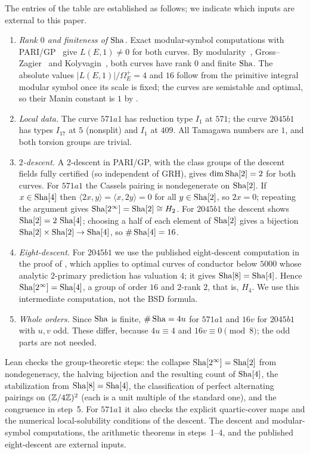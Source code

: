 The entries of the table are established as follows; we indicate which
inputs are external to this paper.
\begin{enumerate}
\item \emph{Rank $0$ and finiteness of $\operatorname{Sha}$.}  Exact modular-symbol
  computations with PARI/GP~\citep{PARI2023} give $L(E,1)\neq0$ for both
  curves.  By modularity~\citep{Wiles1995,BreuilConradDiamondTaylor2001},
  Gross--Zagier~\citep{GrossZagier1986} and
  Kolyvagin~\citep{Kolyvagin1990}, both curves have rank $0$ and finite
  $\operatorname{Sha}$.  The absolute values $|L(E,1)|/\Omega_E^+=4$ and $16$ follow
  from the primitive integral modular symbol once its scale is fixed;
  the curves are semistable and optimal, so their Manin constant is $1$
  by \citet[Theorem~1.2]{Cesnavicius2018}.
\item \emph{Local data.}  The curve $571a1$ has reduction type $I_1$ at
  $571$; the curve $2045b1$ has types $I_{17}$ at $5$ (nonsplit) and $I_1$
  at $409$.  All Tamagawa numbers are $1$, and both torsion groups are
  trivial.
\item \emph{$2$-descent.}  A $2$-descent in PARI/GP, with the class
  groups of the descent fields fully certified (so independent of GRH),
  gives $\dim\operatorname{Sha}[2]=2$ for both curves.  For $571a1$ the Cassels pairing
  is nondegenerate on $\operatorname{Sha}[2]$.  If $x\in\operatorname{Sha}[4]$ then
  $\langle 2x,y\rangle=\langle x,2y\rangle=0$ for all $y\in\operatorname{Sha}[2]$, so
  $2x=0$; repeating the argument gives $\operatorname{Sha}[2^\infty]=\operatorname{Sha}[2]\cong
  H_2$.  For $2045b1$ the descent shows $\operatorname{Sha}[2]=2\,\operatorname{Sha}[4]$; choosing a
  half of each element of $\operatorname{Sha}[2]$ gives a bijection
  $\operatorname{Sha}[2]\times\operatorname{Sha}[2]\to\operatorname{Sha}[4]$, so $\#\operatorname{Sha}[4]=16$.
\item \emph{Eight-descent.}  For $2045b1$ we use the published
  eight-descent computation in the proof of
  \citet[Theorem~7.1]{Miller2011}, which applies to optimal curves of
  conductor below $5000$ whose analytic $2$-primary prediction has
  valuation $4$; it gives $\operatorname{Sha}[8]=\operatorname{Sha}[4]$.  Hence
  $\operatorname{Sha}[2^\infty]=\operatorname{Sha}[4]$, a group of order $16$ and $2$-rank $2$,
  that is, $H_4$.  We use this intermediate computation, not the BSD
  formula.
\item \emph{Whole orders.}  Since $\operatorname{Sha}$ is finite, $\#\operatorname{Sha}=4u$ for
  $571a1$ and $16v$ for $2045b1$ with $u,v$ odd.  These differ, because
  $4u\equiv4$ and $16v\equiv0\pmod 8$; the odd parts are not needed.
\end{enumerate}
Lean checks the group-theoretic steps: the collapse
$\operatorname{Sha}[2^\infty]=\operatorname{Sha}[2]$ from nondegeneracy, the halving bijection and
the resulting count of $\operatorname{Sha}[4]$, the stabilization from
$\operatorname{Sha}[8]=\operatorname{Sha}[4]$, the classification of perfect alternating pairings on
$(\mathbb{Z}/4\mathbb{Z})^2$ (each is a unit multiple of the standard one), and the
congruence in step~5.  For $571a1$ it also checks the explicit
quartic-cover maps and the numerical local-solubility conditions of the
descent.  The descent and modular-symbol computations, the arithmetic
theorems in steps~1--4, and the published eight-descent are external
inputs.

